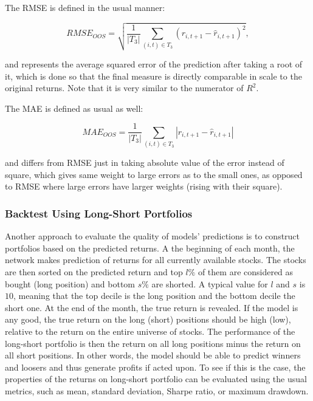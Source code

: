 			The RMSE is defined in the usual manner:   
			
			\begin{equation*}
				RMSE_{OOS} = \sqrt{ \frac{1}{|T_3|} \sum_{(i,t)\in T_3} \left(r_{i,t+1}-	\hat{r}_{i, t+1}\right) ^2},	
			\end{equation*}
			
			and represents the average squared error of the prediction after taking a root of it, which is done so that the final measure is directly comparable in scale to the original returns. Note that it is very similar to the numerator of $R^2$.
			
			The MAE is defined as usual as well: 
			
			\begin{equation*}
				MAE_{OOS} = \frac{1}{|T_3|} \sum_{(i,t)\in T_3} |r_{i,t+1}-	\hat{r}_{i, t+1}|
			\end{equation*}
			
			and differs from RMSE just in taking absolute value of the error instead of square, which gives same weight to large errors as to the small ones, as opposed to RMSE where large errors have larger weights (rising with their square). 
	
		\subsubsection{Backtest Using Long-Short Portfolios}
			Another approach to evaluate the quality of models' predictions is to construct portfolios based on the predicted returns. A the beginning of each month, the network makes prediction of returns for all currently available stocks. The stocks are then sorted on the predicted return and top $l\%$ of them are considered as bought (long position) and bottom $s\%$ are shorted. A typical value for $l$ and $s$ is $10$, meaning that the top decile is the long position and the bottom decile the short one. At the end of the month, the true return is revealed. If the model is any good, the true return on the long (short) positions should be high (low), relative to the return on the entire universe of stocks. The performance of the long-short portfolio is then the return on all long positions minus the return on all short positions. In other words, the model should be able to predict winners and loosers and thus generate profits if acted upon. To see if this is the case, the properties of the returns on long-short portfolio can be evaluated using the usual metrics, such as mean, standard deviation, Sharpe ratio, or maximum drawdown. 
			
